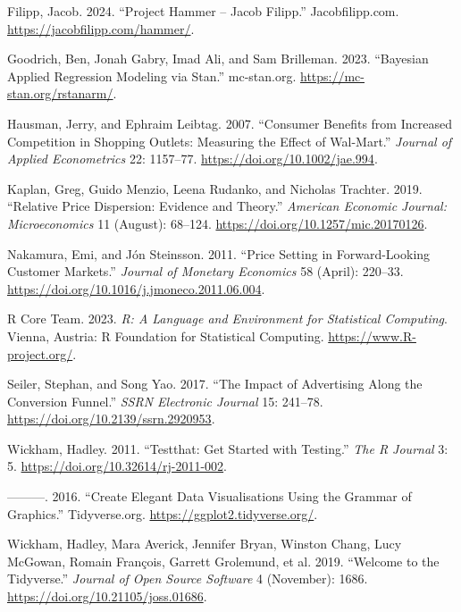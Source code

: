 \documentclass[
  letterpaper,
  DIV=11,
  numbers=noendperiod]{scrartcl}
\newlength{\cslhangindent}
\newenvironment{CSLReferences}[2] %
 {\begin{list}{}{%
  \setlength{\itemindent}{0pt}
  \setlength{\leftmargin}{0pt}
  \setlength{\parsep}{0pt}
  \ifodd #1
   \setlength{\leftmargin}{\cslhangindent}
   \setlength{\itemindent}{-1\cslhangindent}
  \fi
  \setlength{\itemsep}{#2\baselineskip}}}
 {\end{list}}
\begin{document}
\begin{CSLReferences}{1}{0}
Filipp, Jacob. 2024. {``Project Hammer -- Jacob Filipp.''}
Jacobfilipp.com. \url{https://jacobfilipp.com/hammer/}.

Goodrich, Ben, Jonah Gabry, Imad Ali, and Sam Brilleman. 2023.
{``Bayesian Applied Regression Modeling via Stan.''} mc-stan.org.
\url{https://mc-stan.org/rstanarm/}.

Hausman, Jerry, and Ephraim Leibtag. 2007. {``Consumer Benefits from
Increased Competition in Shopping Outlets: Measuring the Effect of
Wal-Mart.''} \emph{Journal of Applied Econometrics} 22: 1157--77.
\url{https://doi.org/10.1002/jae.994}.

Kaplan, Greg, Guido Menzio, Leena Rudanko, and Nicholas Trachter. 2019.
{``Relative Price Dispersion: Evidence and Theory.''} \emph{American
Economic Journal: Microeconomics} 11 (August): 68--124.
\url{https://doi.org/10.1257/mic.20170126}.

Nakamura, Emi, and Jón Steinsson. 2011. {``Price Setting in
Forward-Looking Customer Markets.''} \emph{Journal of Monetary
Economics} 58 (April): 220--33.
\url{https://doi.org/10.1016/j.jmoneco.2011.06.004}.

R Core Team. 2023. \emph{R: A Language and Environment for Statistical
Computing}. Vienna, Austria: R Foundation for Statistical Computing.
\url{https://www.R-project.org/}.

Seiler, Stephan, and Song Yao. 2017. {``The Impact of Advertising Along
the Conversion Funnel.''} \emph{SSRN Electronic Journal} 15: 241--78.
\url{https://doi.org/10.2139/ssrn.2920953}.

Wickham, Hadley. 2011. {``Testthat: Get Started with Testing.''}
\emph{The R Journal} 3: 5. \url{https://doi.org/10.32614/rj-2011-002}.

---------. 2016. {``Create Elegant Data Visualisations Using the Grammar
of Graphics.''} Tidyverse.org. \url{https://ggplot2.tidyverse.org/}.

Wickham, Hadley, Mara Averick, Jennifer Bryan, Winston Chang, Lucy
McGowan, Romain François, Garrett Grolemund, et al. 2019. {``Welcome to
the Tidyverse.''} \emph{Journal of Open Source Software} 4 (November):
1686. \url{https://doi.org/10.21105/joss.01686}.

\end{CSLReferences}
\end{document}
